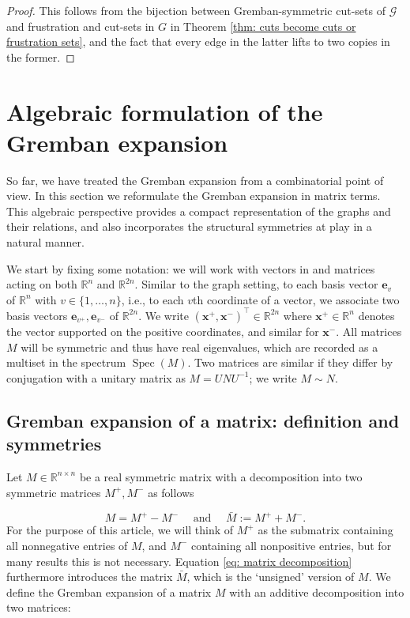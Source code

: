 \documentclass[reprint,onecolumn]{article}
\newcommand{\R}{\mathbb{R}}
\newcommand{\1}{\mathbb{1}}
\newcommand{\0}{\mathbf{0}}
\DeclareMathOperator\spec{Spec}
\begin{document}
\begin{proof}
This follows from the bijection between Gremban-symmetric cut-sets of $\mathcal{G}$ and frustration and cut-sets in $G$ in Theorem \ref{thm: cuts become cuts or frustration sets}, and the fact that every edge in the latter lifts to two copies in the former.
\end{proof}
%
\section{Algebraic formulation of the Gremban expansion}
\label{sec:gremban_algebraic}

So far, we have treated the Gremban expansion from a combinatorial point of view. In this section we reformulate the Gremban expansion in matrix terms. This algebraic perspective provides a compact representation of the graphs and their relations, and also incorporates the structural symmetries at play in a natural manner. 

We start by fixing some notation: we will work with vectors in and matrices acting on both $\R^n$ and $\R^{2n}$. Similar to the graph setting, to each basis vector $\mathbf{e}_{v}$ of $\R^n$ with $v\in\{1,\dots,n\}$, i.e., to each $v$th coordinate of a vector, we associate two basis vectors $\mathbf{e}_{v^+},\mathbf{e}_{v^-}$ of $\R^{2n}$. We write $(\mathbf{x}^+,\mathbf{x}^-)^\top\in\R^{2n}$ where $\mathbf{x}^+\in\R^n$ denotes the vector supported on the positive coordinates, and similar for $\mathbf{x}^-$. All matrices $M$ will be symmetric and thus have real eigenvalues, which are recorded as a multiset in the spectrum $\spec(M)$. Two matrices are similar if they differ by conjugation with a unitary matrix as $M=UNU^{-1}$; we write $M\sim N$.
%
\subsection{Gremban expansion of a matrix: definition and symmetries}
Let $M\in\R^{n\times n}$ be a real symmetric matrix with a decomposition into two symmetric matrices $M^+, M^-$ as follows

\begin{equation}\label{eq: matrix decomposition}
M=M^+-M^- \quad\text{~and~}\quad \bar{M} := M^+ + M^-.
\end{equation}
For the purpose of this article, we will think of $M^+$ as the submatrix containing all nonnegative entries of $M$, and $M^-$ containing all nonpositive entries, but for many results this is not necessary. Equation \eqref{eq: matrix decomposition} furthermore introduces the matrix $\bar{M}$, which is the `unsigned' version of $M$. We define the Gremban expansion of a matrix $M$ with an additive decomposition into two matrices:
\end{document}
